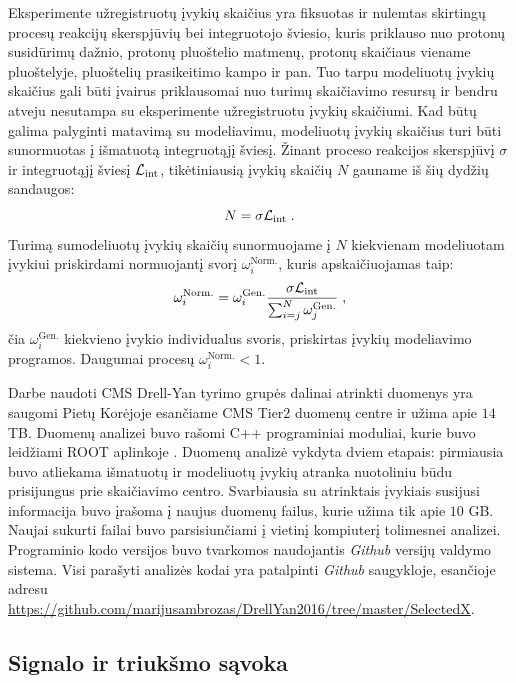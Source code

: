 \documentclass[a4paper, 12pt, oneside]{article}
\newcommand{\Lumi}{{\cal L}_\mathrm{int}}
\newlength\q
\begin{document}
Eksperimente užregistruotų įvykių skaičius yra fiksuotas ir nulemtas skirtingų procesų reakcijų skerspjūvių bei
integruotojo šviesio, kuris priklauso nuo protonų susidūrimų dažnio, protonų pluoštelio matmenų, protonų skaičiaus
viename pluoštelyje, pluoštelių prasikeitimo kampo ir pan.
Tuo tarpu modeliuotų įvykių skaičius gali būti įvairus priklausomai nuo turimų skaičiavimo resursų ir bendru atveju
nesutampa su eksperimente užregistruotu įvykių skaičiumi.
Kad būtų galima palyginti matavimą su modeliavimu, modeliuotų įvykių skaičius turi būti sunormuotas
į išmatuotą integruotąjį šviesį.
Žinant proceso reakcijos skerspjūvį $\sigma$ ir integruotąjį šviesį $\Lumi$, tikėtiniausią įvykių skaičių $N$
gauname iš šių dydžių sandaugos:
\begin{equation}
	N = \sigma\Lumi \; .
\end{equation}
Turimą sumodeliuotų įvykių skaičių sunormuojame į $N$ kiekvienam modeliuotam įvykiui priskirdami normuojantį svorį
$\omega_{i}^{\mathrm{Norm.}}$, kuris apskaičiuojamas taip:
\begin{equation}
	\omega_{i}^{\mathrm{Norm.}} = \omega_{i}^{\mathrm{Gen.}} \frac{ \sigma\Lumi }{ \sum_{i=j}^{N}\omega_{j}^{\mathrm{Gen.}} } \; ,
	\label{eq:NLOweight}
\end{equation}
čia $\omega_{i}^{\mathrm{Gen.}}$ kiekvieno įvykio individualus svoris, priskirtas įvykių modeliavimo programos.
Daugumai procesų $\omega_{i}^{\mathrm{Norm.}}<1$.

Darbe naudoti CMS Drell-Yan tyrimo grupės dalinai atrinkti duomenys yra saugomi Pietų Korėjoje esančiame CMS Tier2
duomenų centre ir užima apie $14$ TB.
Duomenų analizei buvo rašomi C++ programiniai moduliai, kurie buvo leidžiami ROOT aplinkoje \cite{ROOTarticle}.
Duomenų analizė vykdyta dviem etapais: pirmiausia buvo atliekama išmatuotų ir modeliuotų įvykių atranka nuotoliniu
būdu prisijungus prie skaičiavimo centro.
Svarbiausia su atrinktais įvykiais susijusi informacija buvo įrašoma į naujus duomenų failus, kurie užima tik
apie $10$ GB.
Naujai sukurti failai buvo parsisiunčiami į vietinį kompiuterį tolimesnei analizei.
Programinio kodo versijos buvo tvarkomos naudojantis \textit{Github} versijų valdymo sistema.
Visi parašyti analizės kodai yra patalpinti \textit{Github} saugykloje, esančioje adresu
\url{https://github.com/marijusambrozas/DrellYan2016/tree/master/SelectedX}.


\subsection{Signalo ir triukšmo sąvoka}\label{sec:sig_bkg}
\end{document}
